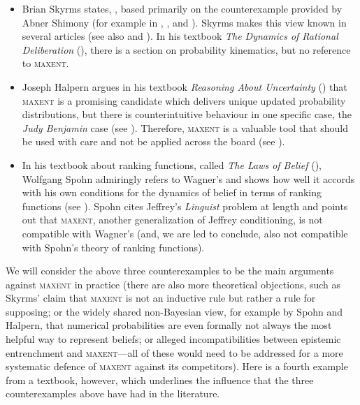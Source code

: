 \documentclass[11pt]{article}
\begin{document}
\begin{itemize}
\item Brian Skyrms states,  , based
  primarily on the counterexample provided by Abner Shimony (for
  example in ,
  , and ). Skyrms
  makes this view known in several articles (see also
   and ). In his
  textbook \emph{The Dynamics of Rational Deliberation}
  (), there is a section on probability
  kinematics, but no reference to \textsc{maxent}.
\item Joseph Halpern argues in his textbook \emph{Reasoning About
    Uncertainty} () that \textsc{maxent} is a
  promising candidate which delivers unique updated probability
  distributions, but there is counterintuitive behaviour in one
  specific case, the \emph{Judy Benjamin} case (see ). Therefore, \textsc{maxent} is a valuable tool that should
  be used with care and not be applied across the board (see
  ).
\item In his textbook about ranking functions, called \emph{The Laws
    of Belief} (), Wolfgang Spohn admiringly
  refers to Wagner's   and shows how well it
  accords with his own conditions for the dynamics of belief in terms
  of ranking functions (see ). Spohn cites
  Jeffrey's \emph{Linguist} problem at length and points out that
  \textsc{maxent}, another generalization of Jeffrey conditioning, is
  not compatible with Wagner's (and, we are led to conclude, also not
  compatible with Spohn's theory of ranking functions).
\end{itemize}

We will consider the above three counterexamples to be the main
arguments against \textsc{maxent} in practice (there are also more
theoretical objections, such as Skyrms' claim that \textsc{maxent} is
not an inductive rule but rather a rule for supposing; or the widely
shared non-Bayesian view, for example by Spohn and Halpern, that
numerical probabilities are even formally not always the most helpful
way to represent beliefs; or alleged incompatibilities between
epistemic entrenchment and \textsc{maxent}---all of these would need
to be addressed for a more systematic defence of \textsc{maxent}
against its competitors). Here is a fourth example from a textbook,
however, which underlines the influence that the three counterexamples
above have had in the literature. 
\end{document}
